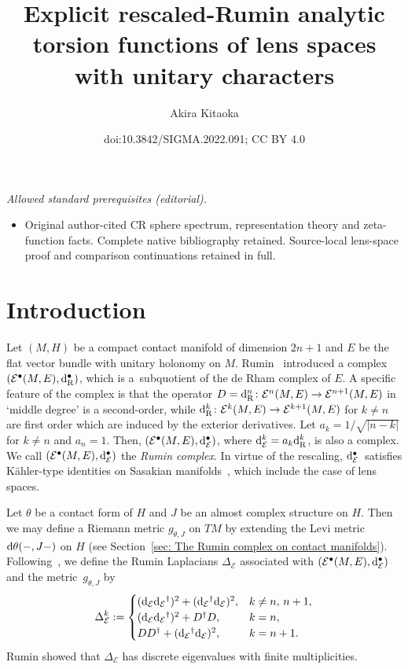 \documentclass[10pt,a4paper]{amsart}
\title{Explicit rescaled-Rumin analytic torsion functions of lens spaces with unitary characters}
\author{Akira Kitaoka}
\date{doi:10.3842/SIGMA.2022.091; CC BY 4.0}
\numberwithin{equation}{section}
\newcommand{\adjoint}{\dagger}
\newcommand{\Rumin}{\mathrm{R}}
\newcommand{\RN}{\cE}
\newcommand{\cE}{\mathcal{E}}
\begin{document}
\maketitle
\noindent\textit{Allowed standard prerequisites (editorial).}\begin{itemize}
\item Original author-cited CR sphere spectrum, representation theory and zeta-function facts. Complete native bibliography retained. Source-local lens-space proof and comparison continuations retained in full.
\end{itemize}\medskip
\section{Introduction}

Let $(M,H)$ be a compact contact manifold of dimension $2n+1$
and $E$ be the flat vector bundle with unitary holonomy on $M$.
Rumin~\cite{Rumin-94} introduced a complex
$(\cE ^\bullet (M ,E) , {\rm d}_{\Rumin }^\bullet )$,
which is
a~subquotient of the de Rham complex of $E$.
A specific feature of the complex is that
the operator $D = {\rm d}_{\Rumin }^n \colon \cE ^{n} (M,E) \to \cE ^{n+1} (M,E) $ in `middle degree' is a second-order,
while
 ${\rm d}_{\Rumin }^k \colon \cE ^{k} (M,E) \to \cE ^{k+1} (M,E) $ for $k \not = n$ are first order which are induced by
the exterior derivatives.
Let $a_k = 1 / \sqrt{|n-k|}$ for $k \not = n$ and $a_n = 1$.
Then, $(\cE ^\bullet (M,E) , {\rm d}_\RN ^\bullet)$,
where ${\rm d}_\RN ^k = a_k {\rm d}_{\Rumin}^k$,
is also a complex.
We call $(\cE ^\bullet (M,E) , {\rm d}_\RN ^\bullet)$ the {\em Rumin complex}.
In virtue of the rescaling, ${\rm d}_\RN ^\bullet$~satisfies K\"{a}hler-type identities on Sasakian manifolds~\cite[equation~(34)]{Rumin-00}, which include the case of lens spaces.

Let $\theta$ be a contact form of $H$
and
$J$ be an almost complex structure on $H$.
Then we may define a Riemann metric $g_{\theta , J}$ on $TM$ by extending the Levi metric ${\rm d} \theta (- ,J-)$ on $H$
(see Section~\ref{sec: The Rumin complex on contact manifolds}).
Following~\cite{Rumin-94}, we define the Rumin Laplacians $\Delta_\RN $ associated with $(\cE ^\bullet (M,E) , {\rm d}_\RN ^\bullet)$ and the metric~$g_{\theta , J}$ by
\[
 \Delta_\RN ^k
 :=
 \begin{cases}
 ( {\rm d}_\RN {\rm d}_\RN {}^{\adjoint })^2
 + ({\rm d}_\RN {}^{\adjoint } {\rm d}_\RN )^2 , & k \not = n, \, n+1 , \\
 ( {\rm d}_\RN {\rm d}_\RN {}^{\adjoint })^2
 + D^{\adjoint } D , & k=n, \\
 D D^{\adjoint }
 + ({\rm d}_\RN {}^{\adjoint } {\rm d}_\RN )^2 , & k =n+1.
 \end{cases}
\]
Rumin showed that $\Delta_\RN $ has discrete eigenvalues with finite multiplicities.
\end{document}
